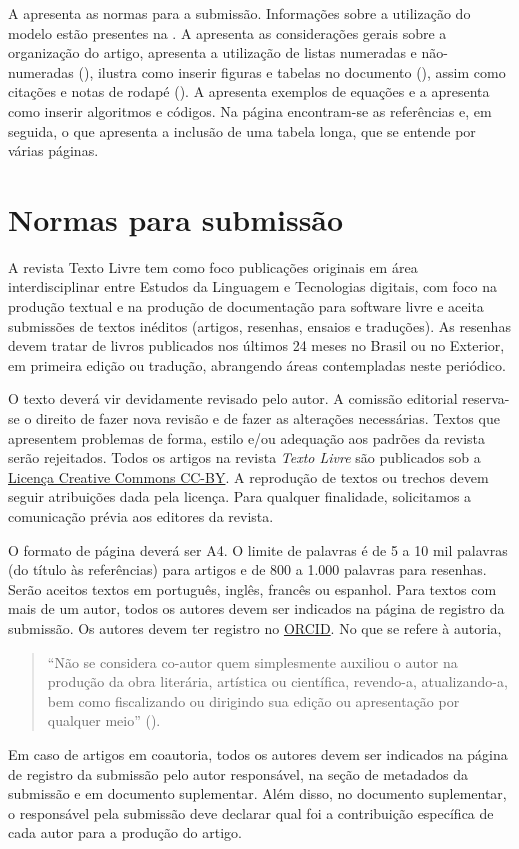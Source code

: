 \documentclass[anonymous=true]{textolivre}
\begin{document}
A  apresenta as normas para a submissão. Informações sobre a utilização do modelo
estão presentes na . A  apresenta as considerações gerais sobre a organização do artigo, 
apresenta a utilização de listas numeradas e não-numeradas (), 
ilustra como inserir figuras e tabelas no documento (), assim como citações 
e notas de rodapé (). A  apresenta exemplos de equações 
e a  apresenta como inserir algoritmos e códigos. 
Na página \pageref{sec-bib} encontram-se as referências e, em seguida, o  que
apresenta a inclusão de uma tabela longa, que se entende por várias páginas. 

\lipsum[1-5]

\section{Normas para submissão}\label{sec-normas}
A revista Texto Livre tem como foco publicações originais em área interdisciplinar entre 
Estudos da Linguagem e Tecnologias digitais, com foco na produção textual e na produção de 
documentação para software livre e aceita submissões de textos inéditos (artigos, resenhas, ensaios e traduções). 
As resenhas devem tratar de livros publicados nos últimos 24 meses no Brasil ou no Exterior, 
em primeira edição ou tradução, abrangendo áreas contempladas neste periódico.

O texto deverá vir devidamente revisado pelo autor. A comissão editorial reserva-se o direito de 
fazer nova revisão e de fazer as alterações necessárias. Textos que apresentem problemas de forma, 
estilo e/ou adequação aos padrões da revista serão rejeitados.
Todos os artigos na revista \textit{Texto Livre} são publicados sob 
a \href{https://creativecommons.org/}{Licença Creative Commons CC-BY}. 
A reprodução de textos ou trechos devem seguir atribuições dada pela licença. 
Para qualquer finalidade, solicitamos a comunicação prévia aos editores da revista.

O formato de página deverá ser A4. O limite de palavras é de 5 a 10 mil palavras (do título às referências) 
para artigos e de 800 a 1.000 palavras para resenhas.
Serão aceitos textos em português, inglês, francês ou espanhol. 
Para textos com mais de um autor, todos os autores devem ser indicados na página de registro da submissão.
Os autores devem ter registro no \href{https://orcid.org/}{ORCID}. No que se refere à autoria,
\begin{quote} 
``Não se considera co-autor quem simplesmente auxiliou o autor na produção da obra literária, artística ou científica, 
revendo-a, atualizando-a, bem como fiscalizando ou dirigindo sua edição ou apresentação por qualquer meio'' ().
\end{quote}
Em caso de artigos em coautoria, todos os autores devem ser indicados na página de registro da submissão pelo autor 
responsável, na seção de metadados da submissão e em documento suplementar. Além disso, no documento suplementar, 
o responsável pela submissão deve declarar qual foi a contribuição específica de cada autor para a produção do artigo.
\end{document}
